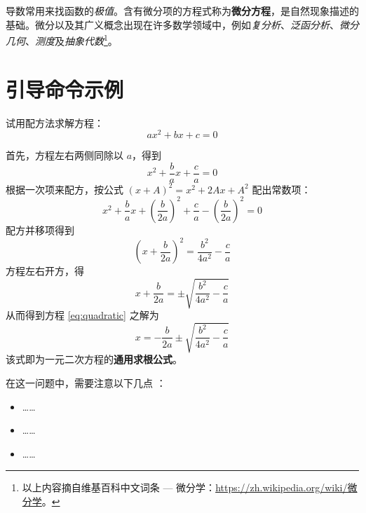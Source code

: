 \documentclass[
  10pt,
  twoside,
  openany,
  b5paper, %
  colorscheme = bootstrap-v4, %
]{qyxf-book}
\numberwithin{equation}{section}
\begin{document}
导数常用来找函数的\emph{极值}。含有微分项的方程式称为\textbf{微分方程}，是自然现象描述的基础。微分以及其广义概念出现在许多数学领域中，例如\emph{复分析}、\emph{泛函分析}、\emph{微分几何}、\emph{测度}及\emph{抽象代数}\footnote{以上内容摘自维基百科中文词条 --- 微分学：\url{https://zh.wikipedia.org/wiki/微分学}。}。

\section{引导命令示例}

 试用配方法求解方程：
\begin{equation}\label{eq:quadratic}
  ax^2 + bx + c = 0
\end{equation}

\solve 首先，方程左右两侧同除以 $a$，得到
\[ x^2 + \frac bax + \frac ca = 0 \]
根据一次项来配方，按公式 $(x+A)^2=x^2+2Ax+A^2$ 配出常数项：
\[ x^2 + \frac bax + \left(\frac b{2a}\right)^2 + \frac ca - \left(\frac b{2a}\right)^2 = 0 \]
配方并移项得到
\[ \left(x + \frac b{2a}\right)^2 = \frac {b^2}{4a^2} - \frac ca \]
方程左右开方，得
\[ x + \frac b{2a} = \pm \sqrt{\frac {b^2}{4a^2} - \frac ca} \]
从而得到方程 \eqref{eq:quadratic} 之解为
\begin{equation}
  x = - \frac b{2a} \pm \sqrt{\frac {b^2}{4a^2} - \frac ca}
\end{equation}
该式即为一元二次方程的\textbf{通用求根公式}。


\analysis 在这一问题中，需要注意以下几点 \cite{texbook,latex}：
\begin{itemize}
  \item ……
  \item ……
  \item ……
\end{itemize}

\end{document}
